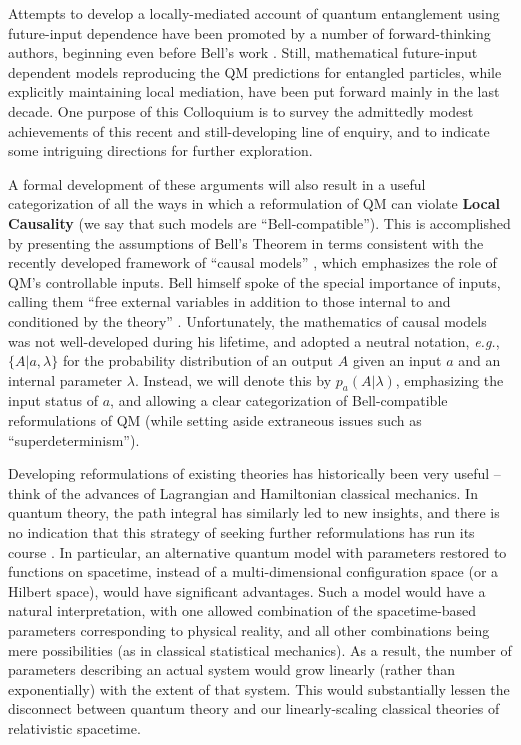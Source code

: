 \documentclass[onecolumn, nofootinbib, 12pt]{revtex4-1}
\begin{document}
Attempts to develop a locally-mediated account of quantum entanglement using future-input dependence have been promoted by a number of forward-thinking authors, beginning even before Bell's work \cite{costa1953,costa1977,costa1979,pegg1982,sutherland1983,price1984}.  Still, mathematical future-input dependent models reproducing the QM predictions for entangled particles, while explicitly maintaining local mediation, have been put forward mainly in the last decade.  One purpose of this Colloquium is to survey the admittedly modest achievements of this recent and still-developing line of enquiry, and to indicate some intriguing directions for further exploration.

A formal development of these arguments will also result in a useful categorization of all the ways in which a reformulation of QM can violate {\bf Local Causality} (we say that such models are ``Bell-compatible'').  This is accomplished by presenting the assumptions of Bell's Theorem in terms consistent with the recently developed framework of ``causal models'' \cite{pearl2009}, which emphasizes the role of QM's controllable inputs.  Bell himself spoke of the special importance of inputs, calling them ``free external variables in addition to those internal to and conditioned by the theory'' \cite{bell1977}.  Unfortunately, the mathematics of causal models was not well-developed during his lifetime, and \textcite{bell1976b,bell1981,bell1990} adopted a neutral notation, \emph{e.g.}, $\{ A | a, \lambda \}$ for the probability distribution of an output $A$ given an input $a$ and an internal parameter $\lambda$.  Instead, we will denote this by $p_a(A|\lambda)$, emphasizing the input status of $a$, and allowing a clear categorization of Bell-compatible reformulations of QM (while setting aside extraneous issues such as ``superdeterminism'').

Developing reformulations of existing theories has historically been very useful -- think of the advances of Lagrangian and Hamiltonian classical mechanics.  In quantum theory, the path integral has similarly led to new insights, and there is no indication that this strategy of seeking further reformulations has run its course \cite{feynman1964}.  In particular, an alternative quantum model with parameters restored to functions on spacetime, instead of a multi-dimensional configuration space (or a Hilbert space), would have significant advantages.  Such a model would have a natural interpretation, with one allowed combination of the spacetime-based parameters corresponding to physical reality, and all other combinations being mere possibilities (as in classical statistical mechanics).  As a result, the number of parameters describing an actual system would grow linearly (rather than exponentially) with the extent of that system.  This would substantially lessen the disconnect between quantum theory and our linearly-scaling classical theories of relativistic spacetime.
\end{document}
